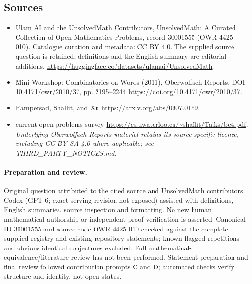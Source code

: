 \documentclass[11pt]{article}
\begin{document}
\subsection{Sources}
\begin{itemize}
\item[\hypertarget{source:30001555:1}{S1}] Ulam AI and the UnsolvedMath Contributors, UnsolvedMath: A Curated Collection of Open Mathematics Problems, record 30001555 (OWR-4425-010). Catalogue curation and metadata: CC BY 4.0. The supplied source question is retained; definitions and the English summary are editorial additions.
\url{https://huggingface.co/datasets/ulamai/UnsolvedMath}.
\item[\hypertarget{source:30001555:2}{S2}] Mini-Workshop: Combinatorics on Words (2011), Oberwolfach Reports, DOI 10.4171/owr/2010/37, pp. 2195--2244
\url{https://doi.org/10.4171/owr/2010/37}.
\item[\hypertarget{source:30001555:3}{S3}] Rampersad, Shallit, and Xu
\url{https://arxiv.org/abs/0907.0159}.
\item[\hypertarget{source:30001555:4}{S4}] current open-problems survey
\url{https://cs.uwaterloo.ca/~shallit/Talks/bc4.pdf}.
\textit{Underlying Oberwolfach Reports material retains its source-specific licence, including CC BY-SA 4.0 where applicable; see THIRD\_PARTY\_NOTICES.md.}
\end{itemize}
\paragraph{Preparation and review.}
Original question attributed to the cited source and UnsolvedMath contributors. Codex (GPT-6; exact serving revision not exposed) assisted with definitions, English summaries, source inspection and formatting. No new human mathematical authorship or independent proof verification is asserted. Canonical ID 30001555 and source code OWR-4425-010 checked against the complete supplied registry and existing repository statements; known flagged repetitions and obvious identical conjectures excluded. Full mathematical-equivalence/literature review has not been performed. Statement preparation and final review followed contribution prompts C and D; automated checks verify structure and identity, not open status.
\label{end:30001555}
\end{document}
